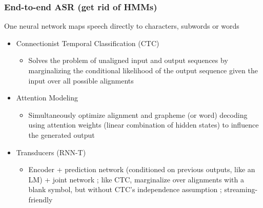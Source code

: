 \documentclass[table]{beamer}
\begin{document}
\begin{frame}
 \frametitle{End-to-end ASR (get rid of HMMs)}
 One neural network maps speech directly to characters, subwords or words
	\begin{itemize}
	\item Connectionist Temporal Classification (CTC)
		\begin{itemize}
		\item Solves the problem of unaligned input and output sequences by marginalizing the conditional likelihood of the output sequence given the input over all possible alignments
		\end{itemize}

	\item Attention Modeling
		\begin{itemize}
		\item Simultaneously optimize alignment and grapheme (or word) decoding using attention weights (linear combination of hidden states) to influence the generated output
		\end{itemize}
	
	\item Transducers (RNN-T) \citep{graves2012transducer}
		\begin{itemize}
		\item Encoder + prediction network (conditioned on previous outputs, like an LM) + joint network ; like CTC, marginalize over alignments with a blank symbol, but without CTC's independence assumption ; streaming-friendly
		\end{itemize}
	\end{itemize}
	
\end{frame}

%		
%
%
%
\end{document}
